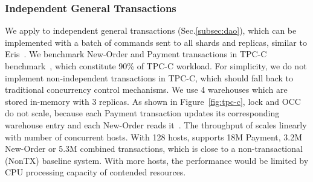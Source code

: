 \subsubsection{Independent General Transactions}
\label{subsec:eval-transactions}

We apply \sys to independent general transactions (Sec.\ref{subsec:dao}), which can be implemented with a batch of commands sent to all shards and replicas, similar to Eris~\cite{eris}.
We benchmark New-Order and Payment transactions in TPC-C benchmark~\cite{tpcc}, which constitute 90\% of TPC-C workload.
For simplicity, we do not implement non-independent transactions in TPC-C, which should fall back to traditional concurrency control mechanisms.
We use 4 warehouses which are stored in-memory with 3 replicas.
As shown in Figure~\ref{fig:tpc-c}, lock and OCC do not scale, because each Payment transaction updates its corresponding warehouse entry and each New-Order reads it~\cite{yu2014staring}.
The throughput of \sys scales linearly with number of concurrent hosts. With 128 hosts, \sys supports 18M Payment, 3.2M New-Order or 5.3M combined transactions, which is close to a non-transactional (NonTX) baseline system. With more hosts, the performance would be limited by CPU processing capacity of contended resources.

